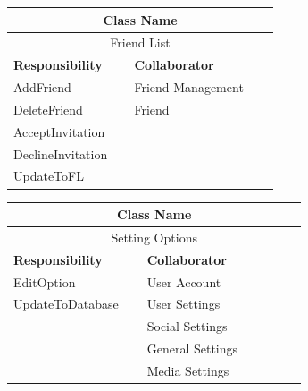 \documentclass[a4paper]{article}
\begin{document}
	\noindent\begin{minipage}{\textwidth}
		\begin{minipage}[t]{0.48\textwidth}
	 	\centering
		\makeatletter{}\makeatother\caption*{}
		  	\begin{tabular}{|p{0.40\linewidth}|p{0.48\linewidth}|} 
	   			\hline
				\multicolumn{2}{|c|}{\textbf{Class Name}} \\
				\hline
				\multicolumn{2}{|c|}{Friend List} \\
				\hline
				\textbf{Responsibility} & \textbf{Collaborator} \\
				\hline
				AddFriend & Friend Management\\
				DeleteFriend & Friend\\
				AcceptInvitation & \\
				DeclineInvitation & \\
				UpdateToFL&\\
				\hline
	   		\end{tabular}
	 	\end{minipage}
	 	\begin{minipage}[t]{0.48\textwidth}
		\centering
		\makeatletter{}\makeatother\caption*{}
			\begin{tabular}{|p{0.40\linewidth}|p{0.48\linewidth}|} 
				\hline
				   \multicolumn{2}{|c|}{\textbf{Class Name}} \\
				   \hline
				   \multicolumn{2}{|c|}{Setting Options} \\
				   \hline
				   \textbf{Responsibility} & \textbf{Collaborator} \\
				   \hline
				   EditOption & User Account\\
				   UpdateToDatabase & User Settings\\
				   &Social Settings\\
				   &General Settings\\
				   &Media Settings\\
				   \hline
			\end{tabular}
		\end{minipage}
   	\end{minipage}
\end{document}
